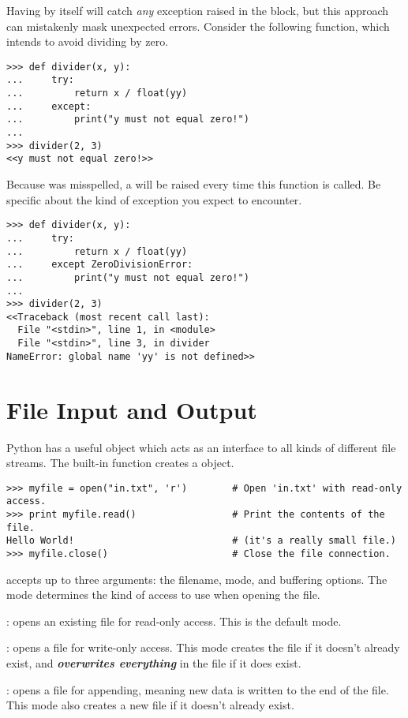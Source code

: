 \begin{warn} %
Having  by itself will catch \emph{any} exception raised in the  block, but this approach can mistakenly mask unexpected errors.
Consider the following function, which intends to avoid dividing by zero.

\begin{lstlisting}
>>> def divider(x, y):
...     try:
...         return x / float(yy)
...     except:
...         print("y must not equal zero!")
...
>>> divider(2, 3)
<<y must not equal zero!>>
\end{lstlisting}

Because  was misspelled, a  will be raised every time this function is called.
Be specific about the kind of exception you expect to encounter.

\begin{lstlisting}
>>> def divider(x, y):
...     try:
...         return x / float(yy)
...     except ZeroDivisionError:
...         print("y must not equal zero!")
...
>>> divider(2, 3)
<<Traceback (most recent call last):
  File "<stdin>", line 1, in <module>
  File "<stdin>", line 3, in divider
NameError: global name 'yy' is not defined>>
\end{lstlisting}
\end{warn}

\section*{File Input and Output} %

Python has a useful  object which acts as an interface to all kinds of different file streams.
The built-in function  creates a  object.

\begin{lstlisting}
>>> myfile = open("in.txt", 'r')        # Open 'in.txt' with read-only access.
>>> print myfile.read()                 # Print the contents of the file.
Hello World!                            # (it's a really small file.)
>>> myfile.close()                      # Close the file connection.
\end{lstlisting}

 accepts up to three arguments: the filename, mode, and buffering options.
The mode determines the kind of access to use when opening the file.
\begin{description}
\item {}: opens an existing file for read-only access.
This is the default mode.
\item {}: opens a file for write-only access.
This mode creates the file if it doesn't already exist, and \textbf{\emph{overwrites everything}} in the file if it does exist.
\item {}: opens a file for appending, meaning new data is written to the end of the file.
This mode also creates a new file if it doesn't already exist.
\end{description}

